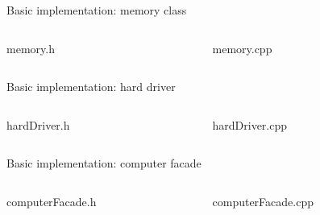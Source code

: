 \documentclass[13pt]{beamer}
\begin{document}
\begin{frame}{Basic implementation: memory class}
\begin{columns}[T]
\begin{column}{.45\textwidth}
\lstset{basicstyle=\tiny,style=myCustomCppStyle}
memory.h

\end{column}

\begin{column}{.45\textwidth}
\lstset{basicstyle=\tiny,style=myCustomCppStyle}
memory.cpp

\end{column}
\end{columns}
\end{frame}

\begin{frame}{Basic implementation: hard driver}
\begin{columns}[T]
\begin{column}{.45\textwidth}
\lstset{basicstyle=\tiny,style=myCustomCppStyle}
hardDriver.h

\end{column}

\begin{column}{.45\textwidth}
\lstset{basicstyle=\tiny,style=myCustomCppStyle}
hardDriver.cpp

\end{column}
\end{columns}
\end{frame}

\begin{frame}{Basic implementation: computer facade}
\begin{columns}[T]
\begin{column}{.45\textwidth}
\lstset{basicstyle=\tiny,style=myCustomCppStyle}
computerFacade.h

\end{column}

\begin{column}{.45\textwidth}
\lstset{basicstyle=\tiny,style=myCustomCppStyle}
computerFacade.cpp

\end{column}
\end{columns}
\end{frame}
\end{document}

